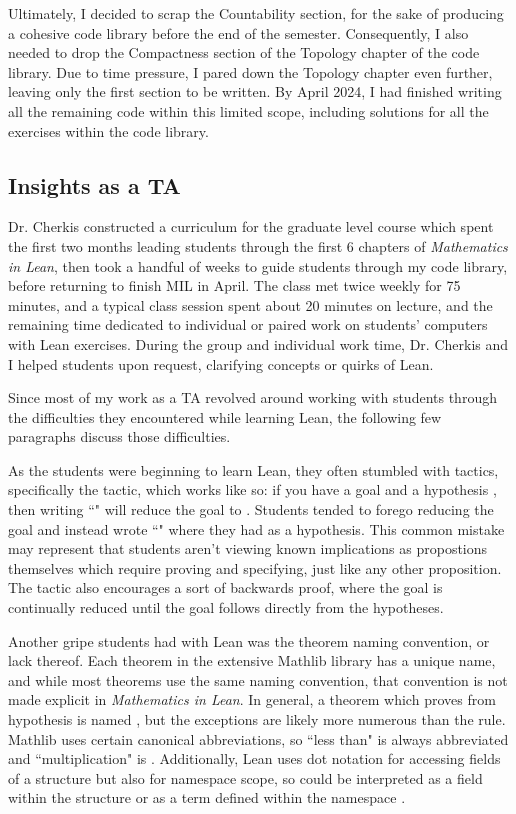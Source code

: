 Ultimately,
I decided to scrap the Countability section, for the sake of producing a 
cohesive code library before the end of the semester. Consequently, I also
needed to drop the Compactness section of the Topology chapter of
the code library. Due to time pressure, I pared down the Topology chapter
even further, leaving only the first section to be written. By April 2024, 
I had finished writing all the remaining code within this limited scope, 
including solutions for all the exercises within the code library.

\subsection{Insights as a TA}

Dr. Cherkis constructed a curriculum for the graduate level course 
which spent the first two months leading students through the first 6
chapters of \textit{Mathematics in Lean}, then took a handful of weeks to 
guide students through my code library, before returning to finish 
MIL in April. The class met twice weekly for 75 minutes, and a typical class
session spent about 20 minutes on lecture, and the remaining time dedicated
to individual or paired work on students' computers with Lean exercises. During
the group and individual work time, Dr. Cherkis and I helped students upon 
request, clarifying concepts or quirks of Lean.

Since most of my work as a TA revolved around working with students 
through the difficulties they encountered while learning Lean, the 
following few paragraphs discuss those difficulties.

As the students were beginning to learn Lean, they often stumbled with
tactics, specifically the  tactic, which works like so:
if you have a goal  and a hypothesis , 
then writing ``" will reduce the goal to . 
Students tended to forego reducing the goal and instead wrote 
``" where they had  as a hypothesis. This common
mistake may represent that students aren't viewing known implications as
propostions themselves which require proving and specifying, just like
any other proposition. The  tactic also encourages a sort of
backwards proof, where the goal is continually reduced until the goal 
follows directly from the hypotheses. 

Another gripe students had with Lean was the theorem naming convention, or lack
thereof. Each theorem in the extensive Mathlib library has a unique
name, and while most theorems use the same naming convention, that
convention is not made explicit in \textit{Mathematics in Lean}. In general, 
a theorem which proves  from hypothesis  is named
, but the exceptions are likely more numerous than
the rule. Mathlib uses certain canonical abbreviations, so ``less than" is
always abbreviated  and ``multiplication" is . Additionally,
Lean uses dot notation for accessing fields of a structure but also
for namespace scope, so  could be 
interpreted as a field within the structure  or as
a term defined within the namespace . 

